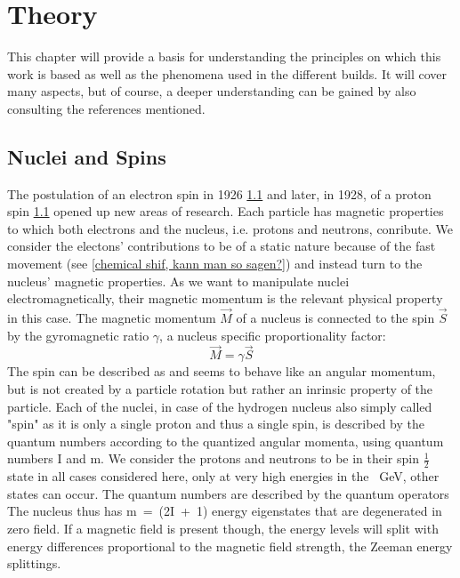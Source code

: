 \chapter{Theory}\label{chap:theory}
    This chapter will provide a basis for understanding the principles on which this work is based as well as the phenomena used in the different builds. It will cover many aspects, but of course, a deeper understanding can be gained by also consulting the references mentioned.
    \section{Nuclei and Spins}
    The postulation of an electron spin in 1926 \ref{} and later, in 1928, of a proton spin \ref{} opened
    up new areas of research.
    Each particle has magnetic properties to which both electrons and the nucleus, i.e. protons and neutrons, conribute. We consider the electons' contributions to be of a static nature because of the fast movement (see \ref{chemical shif, kann man so sagen?}) and instead turn to the nucleus' magnetic properties. As we want to manipulate nuclei electromagnetically, their magnetic momentum is the relevant physical property in this case.
    The magnetic momentum $\vec M$ of a nucleus is connected to the spin $\vec S$ by the gyromagnetic ratio $\gamma$, a nucleus specific proportionality factor:
    \begin{equation}
        \vec M = \gamma \vec S
        \label{eq:gyromagneticRatio}
    \end{equation}
    The spin can be described as and seems to behave like an angular momentum, but is not created by a particle rotation but rather an inrinsic property of the particle. Each of the nuclei, in case of the hydrogen nucleus also simply called "spin" as it is only a single proton and thus a single spin, is described by the quantum numbers according to the quantized angular momenta, using quantum numbers I and m. We consider the protons and neutrons to be in their spin $\tfrac{1}{2}$ state in all cases considered here, only at very high energies in the \SI{}{\giga\electronvolt}, other states can occur. The quantum numbers are described by the quantum operators   The nucleus thus has m~=~(2I~+~1) energy eigenstates that are degenerated in zero field. If a magnetic field is present though, the energy levels will split with energy differences proportional to the magnetic field strength, the Zeeman energy splittings.
